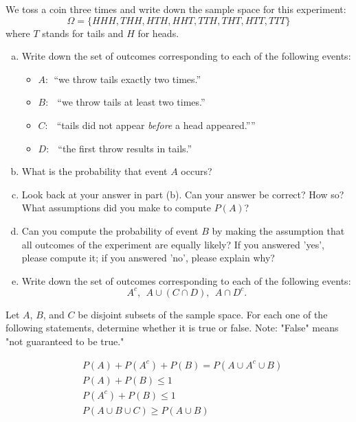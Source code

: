 \documentclass[12pt]{article}
\newenvironment{question}[2][Question]{\begin{trivlist}
\item[\hskip \labelsep {\bfseries #1}\hskip \labelsep {\bfseries #2.}]}{\end{trivlist}}
\begin{document}
 \begin{question}{4} We toss a coin three times and write down the sample space for this experiment:
 $$\Omega = \{ HHH, THH,HTH,HHT, TTH, THT,HTT, TTT \}$$
 where $T$ stands for tails and $H$ for heads.
 

\begin{enumerate}[(a)]
\item 
 Write down the set of outcomes corresponding to each of the following
events:
\begin{itemize}
 \item $A:\ \ $``we throw tails exactly two times.''
 \item $B:\ \ $  ``we throw tails at least two times.''
 \item $C:\ \ $  ``tails did not appear \emph{before} a head appeared.”''
 \item $D:\ \ $  ``the first throw results in tails.''
 \end{itemize}
 \item What is the probability that event $A$ occurs?
 \item Look back at your answer in part (b). Can your answer be correct? How so? What assumptions did you make to compute $P(A)$?
 \item Can you compute the probability of event $B$ by making the assumption that all outcomes of the experiment are equally likely? If you answered 'yes', please compute it; if you answered 'no', please explain why?
 \item Write down the set of outcomes corresponding to each of the following events:
 $$ A^c, \ \ A \cup (C \cap D), \ \  A \cap D^c. $$
 \end{enumerate}
 
\end{question} 

\vspace{5mm}


 \begin{question}{5} Let $A$, $B$, and $C$ be disjoint subsets of the sample space. For each one of the following statements, determine whether it is true or false. Note: "False" means "not guaranteed to be true."

\begin{align}
&P(A) + P(A^c) + P(B) = P(A \cup A^c \cup B) \\
&P(A) + P(B) \leq 1 \\
&P(A^c) + P(B) \leq 1 \\
&P(A \cup B \cup C) \geq P(A \cup B)
\end{align}
\end{question} 
\end{document}
